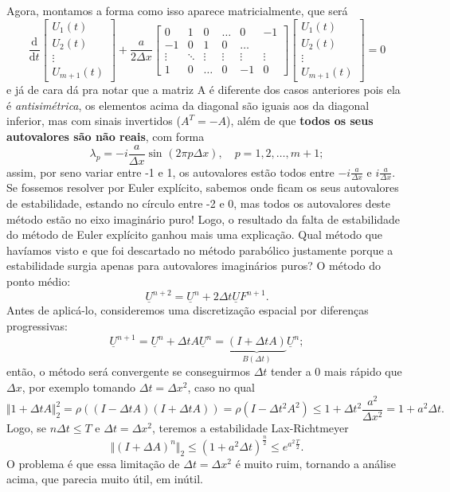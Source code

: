 \documentclass[../differential_methods.tex]{subfiles}
\begin{document}
Agora, montamos a forma como isso aparece matricialmente, que será
\[
	\frac{\mathrm{d}}{\mathrm{d}t}\begin{bmatrix}
		U_1(t) \\
		U_2(t) \\
		\vdots \\
		U_{m+1}(t)
	\end{bmatrix} + \frac{a}{2\Delta x}\begin{bmatrix}
		0      & 1      & 0      & \dotsc & 0      & -1     \\
		-1     & 0      & 1      & 0      & \dotsc &        \\
		\vdots & \ddots & \vdots & \vdots & \vdots & \vdots \\
		1      & 0      & \dotsc & 0      & -1     & 0
	\end{bmatrix}\begin{bmatrix}
		U_1(t) \\
		U_2(t) \\
		\vdots \\
		U_{m+1}(t)
	\end{bmatrix}=0
\]
e já de cara dá pra notar que a matriz A é diferente dos casos anteriores pois ela é \textit{antisimétrica}, os elementos acima da diagonal são iguais aos da diagonal inferior, mas com sinais invertidos (\(A^{T} = -A\)), além de que \textbf{todos os seus autovalores são não reais}, com forma
\[
	\lambda_{p} = -i \frac{a}{\Delta x}\sin^{}{(2\pi p \Delta x)}, \quad p=1, 2, \dotsc ,m+1;
\]
assim, por seno variar entre -1 e 1, os autovalores estão todos entre \(-i \frac{a}{\Delta x}\) e \(i \frac{a}{\Delta x}\). Se fossemos resolver por Euler explícito, sabemos onde ficam os seus autovalores de estabilidade, estando no círculo entre -2 e 0, mas todos os autovalores deste método estão no eixo imaginário puro! Logo, o resultado da falta de estabilidade do método de Euler explícito ganhou mais uma explicação.
Qual método que havíamos visto e que foi descartado no método parabólico justamente porque a estabilidade surgia apenas para autovalores imaginários puros? O método do ponto médio:
\[
	\boxed{\underline{U}^{n+2} = \underline{U}^{n} + 2\Delta t \underline{U}F^{n+1}}.
\]
Antes de aplicá-lo, consideremos uma discretização espacial por diferenças progressivas:
\[
	\underline{U}^{n+1} = \underline{U}^{n} + \Delta t A \underline{U}^{n} = \underbrace{(I + \Delta t A)}_{B(\Delta t)}\underline{U}^{n};
\]
então, o método será convergente se conseguirmos \(\Delta t\) tender a 0 mais rápido que \(\Delta x\), por exemplo tomando \(\Delta t = \Delta x^{2}\), caso no qual
\[
	\Vert 1 + \Delta t A \Vert_{2}^{2} = \rho ((I-\Delta tA)(I+\Delta tA)) = \rho (I-\Delta t^{2}A^{2})\leq 1 + \Delta t^{2}\frac{a^{2}}{\Delta x^{2}}=1 + a^{2}\Delta t.
\]
Logo, se \(n\Delta t \leq T\) e \(\Delta t = \Delta x^{2}\), teremos a estabilidade Lax-Richtmeyer
\[
	\Vert (I+\Delta A)^{n} \Vert_{2} \leq (1+a^{2}\Delta t)^{\frac{n}{2}}\leq e^{a^{2}\frac{T}{2}}.
\]
O problema é que essa limitação de \(\Delta t = \Delta x^{2}\) é muito ruim, tornando a análise acima, que parecia muito útil, em inútil.
\end{document}
